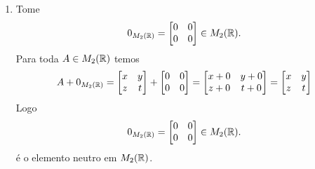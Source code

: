 \documentclass[12pt]{exam}
\begin{document}
\begin{enumerate}
    \item Tome
    \[
        0_{M_2(\mathbb{R})} = \begin{bmatrix}
            0 & 0\\0 & 0
        \end{bmatrix} \in M_2(\mathbb{R}).
    \]
    Para toda $A \in M_2(\mathbb{R})$ temos
    \begin{align}
        A + 0_{M_2(\mathbb{R})} = \begin{bmatrix}
        x & y\\
        z & t
    \end{bmatrix} + \begin{bmatrix}
        0 & 0\\
        0 & 0
    \end{bmatrix} = \begin{bmatrix}
        x + 0& y + 0\\
        z + 0& t + 0
    \end{bmatrix} = \begin{bmatrix}
        x & y\\
        z & t
    \end{bmatrix}
    \end{align}
    Logo
    \[
        0_{M_2(\mathbb{R})} = \begin{bmatrix}
            0 & 0\\0 & 0
        \end{bmatrix} \in M_2(\mathbb{R}).
    \]
    \'e o elemento neutro em $M_2(\mathbb{R})$.


\end{enumerate}
\end{document}
